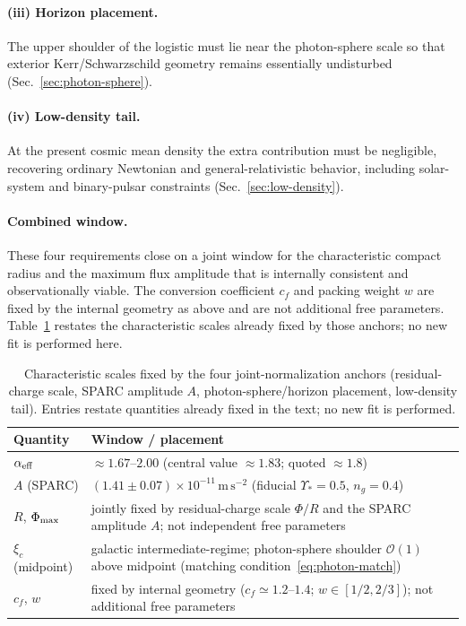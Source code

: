 \documentclass[11pt,a4paper]{article}
\begin{document}
\paragraph{(iii) Horizon placement.}
The upper shoulder of the logistic must lie near the photon-sphere scale so that exterior Kerr/Schwarzschild geometry remains essentially undisturbed (Sec.~\ref{sec:photon-sphere}).

\paragraph{(iv) Low-density tail.}
At the present cosmic mean density the extra contribution must be negligible, recovering ordinary Newtonian and general-relativistic behavior, including solar-system and binary-pulsar constraints (Sec.~\ref{sec:low-density}).

\paragraph{Combined window.}
These four requirements close on a joint window for the characteristic compact radius and the maximum flux amplitude that is internally consistent and observationally viable. The conversion coefficient \(c_f\) and packing weight \(w\) are fixed by the internal geometry as above and are not additional free parameters. Table~\ref{tab:joint-norm-window} restates the characteristic scales already fixed by those anchors; no new fit is performed here.

\begin{table}[H]
\centering
\caption{Characteristic scales fixed by the four joint-normalization anchors (residual-charge scale, SPARC amplitude \(A\), photon-sphere/horizon placement, low-density tail). Entries restate quantities already fixed in the text; no new fit is performed.}
\label{tab:joint-norm-window}
\begin{tabular}{@{}ll@{}}
\toprule
Quantity & Window / placement \\
\midrule
\(\alpha_{\rm eff}\) & \(\approx 1.67\)--\(2.00\) (central value \(\approx 1.83\); quoted \(\approx 1.8\)) \\
\(A\) (SPARC) & \((1.41\pm 0.07)\times 10^{-11}\,\mathrm{m\,s^{-2}}\) (fiducial \(\Upsilon_*=0.5\), \(n_g=0.4\)) \\
\(R\), \(\Phi_{\rm max}\) & jointly fixed by residual-charge scale \(\Phi/R\) and the SPARC amplitude \(A\); not independent free parameters \\
\(\xi_c\) (midpoint) & galactic intermediate-regime; photon-sphere shoulder \(\mathcal{O}(1)\) above midpoint (matching condition~\eqref{eq:photon-match}) \\
\(c_f\), \(w\) & fixed by internal geometry (\(c_f\simeq 1.2\)--\(1.4\); \(w\in[1/2,2/3]\)); not additional free parameters \\
\bottomrule
\end{tabular}
\end{table}
\end{document}
